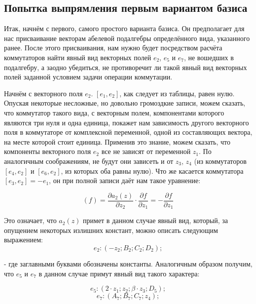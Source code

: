 \documentclass{article}
\begin{document}
\subsection{Попытка выпрямления первым вариантом базиса}
Итак, начнём с первого, самого простого варианта базиса. Он предполагает для нас присваивание векторам абелевой подалгебры определённого вида, указанного ранее. После этого присваивания, нам нужно будет посредством расчёта коммутаторов найти явный вид векторных полей $e_{2}$, $e_{5}$ и $e_{7}$, не вошедших в подалгебру, а заодно убедиться, не противоречит ли такой явный вид векторных полей заданной условием задачи операции коммутации.

Начнём с векторного поля $e_{2}$. $[e_{1}, e_{2}]$, как следует из таблицы, равен нулю. Опуская некоторые несложные, но довольно громоздкие записи, можем сказать, что коммутатор такого вида, с векторным полем, компонентами которого являются три нуля и одна единица, покажет нам зависимость другого векторного поля в коммутаторе от комплексной переменной, одной из составляющих вектора, на месте которой стоит единица. Применив это знание, можем сказать, что компоненты векторного поля $e_{2}$ все не зависят от переменной $z_{1}$. По аналогичным соображениям, не будут они зависеть и от $z_{3}$, $z_{4}$ (из коммутаторов $[e_{4}, e_{2}]$ и $[e_{6}, e_{2}]$, из которых оба равны нулю). Что же касается коммутатора $[e_{3}, e_{2}] = -e_{1}$, он при полной записи даёт нам такое уравнение:

\begin{equation*}
[e_{3}, e_{2}](f) = \frac{\partial a_{2}(z)}{\partial z_{2}} \cdot \frac{\partial f}{\partial z_{1}} = -\frac{\partial f}{\partial z_{1}}
\end{equation*}

Это означает, что $a_{2}(z)$ примет в данном случае явный вид, который, за опущением некоторых излишних констант, можно описать следующим выражением:
\begin{equation}
e_{2}:(-z_{2} ; B_{2} ; C_{2} ; D_{2});
\end{equation}

- где заглавными буквами обозначены константы. Аналогичным образом получим, что $e_{5}$ и $e_{7}$ в данном случае примут явный вид такого характера:

\begin{equation}
e_{5}:(2\cdot z_{1} ; z_{2} ; \beta \cdot z_{3} ; D_{5});
\end{equation}
\begin{equation}
e_{7}:(A_{7} ; B_{7} ; C_{7} ; z_{4});
\end{equation}
\end{document}
